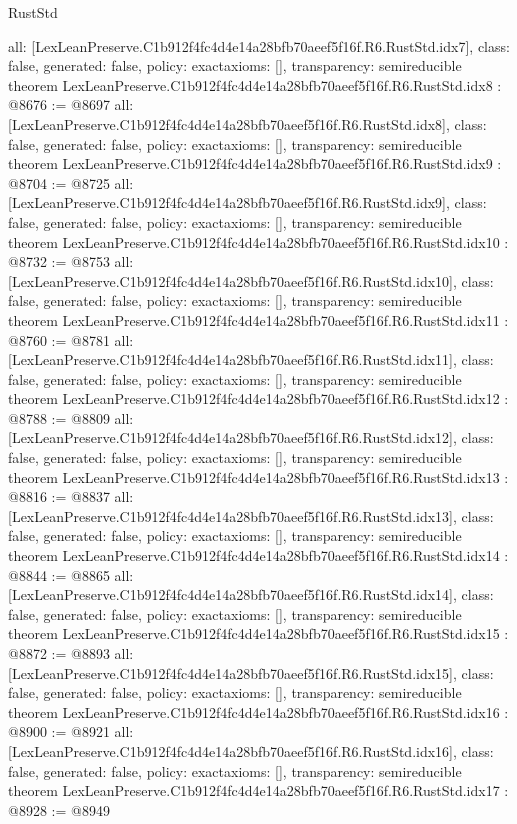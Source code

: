 \begin{lexlean}{RustStd}
\begin{coremodule}
{  all: [LexLeanPreserve.C1b912f4fc4d4e14a28bfb70aeef5f16f.R6.RustStd.idx7],
  class: false,
  generated: false,
  policy: exact{axioms: []},
  transparency: semireducible
}
theorem LexLeanPreserve.C1b912f4fc4d4e14a28bfb70aeef5f16f.R6.RustStd.idx8 : @8676 := @8697 {
  all: [LexLeanPreserve.C1b912f4fc4d4e14a28bfb70aeef5f16f.R6.RustStd.idx8],
  class: false,
  generated: false,
  policy: exact{axioms: []},
  transparency: semireducible
}
theorem LexLeanPreserve.C1b912f4fc4d4e14a28bfb70aeef5f16f.R6.RustStd.idx9 : @8704 := @8725 {
  all: [LexLeanPreserve.C1b912f4fc4d4e14a28bfb70aeef5f16f.R6.RustStd.idx9],
  class: false,
  generated: false,
  policy: exact{axioms: []},
  transparency: semireducible
}
theorem LexLeanPreserve.C1b912f4fc4d4e14a28bfb70aeef5f16f.R6.RustStd.idx10 : @8732 := @8753 {
  all: [LexLeanPreserve.C1b912f4fc4d4e14a28bfb70aeef5f16f.R6.RustStd.idx10],
  class: false,
  generated: false,
  policy: exact{axioms: []},
  transparency: semireducible
}
theorem LexLeanPreserve.C1b912f4fc4d4e14a28bfb70aeef5f16f.R6.RustStd.idx11 : @8760 := @8781 {
  all: [LexLeanPreserve.C1b912f4fc4d4e14a28bfb70aeef5f16f.R6.RustStd.idx11],
  class: false,
  generated: false,
  policy: exact{axioms: []},
  transparency: semireducible
}
theorem LexLeanPreserve.C1b912f4fc4d4e14a28bfb70aeef5f16f.R6.RustStd.idx12 : @8788 := @8809 {
  all: [LexLeanPreserve.C1b912f4fc4d4e14a28bfb70aeef5f16f.R6.RustStd.idx12],
  class: false,
  generated: false,
  policy: exact{axioms: []},
  transparency: semireducible
}
theorem LexLeanPreserve.C1b912f4fc4d4e14a28bfb70aeef5f16f.R6.RustStd.idx13 : @8816 := @8837 {
  all: [LexLeanPreserve.C1b912f4fc4d4e14a28bfb70aeef5f16f.R6.RustStd.idx13],
  class: false,
  generated: false,
  policy: exact{axioms: []},
  transparency: semireducible
}
theorem LexLeanPreserve.C1b912f4fc4d4e14a28bfb70aeef5f16f.R6.RustStd.idx14 : @8844 := @8865 {
  all: [LexLeanPreserve.C1b912f4fc4d4e14a28bfb70aeef5f16f.R6.RustStd.idx14],
  class: false,
  generated: false,
  policy: exact{axioms: []},
  transparency: semireducible
}
theorem LexLeanPreserve.C1b912f4fc4d4e14a28bfb70aeef5f16f.R6.RustStd.idx15 : @8872 := @8893 {
  all: [LexLeanPreserve.C1b912f4fc4d4e14a28bfb70aeef5f16f.R6.RustStd.idx15],
  class: false,
  generated: false,
  policy: exact{axioms: []},
  transparency: semireducible
}
theorem LexLeanPreserve.C1b912f4fc4d4e14a28bfb70aeef5f16f.R6.RustStd.idx16 : @8900 := @8921 {
  all: [LexLeanPreserve.C1b912f4fc4d4e14a28bfb70aeef5f16f.R6.RustStd.idx16],
  class: false,
  generated: false,
  policy: exact{axioms: []},
  transparency: semireducible
}
theorem LexLeanPreserve.C1b912f4fc4d4e14a28bfb70aeef5f16f.R6.RustStd.idx17 : @8928 := @8949 {
}
\end{coremodule}
\end{lexlean}
